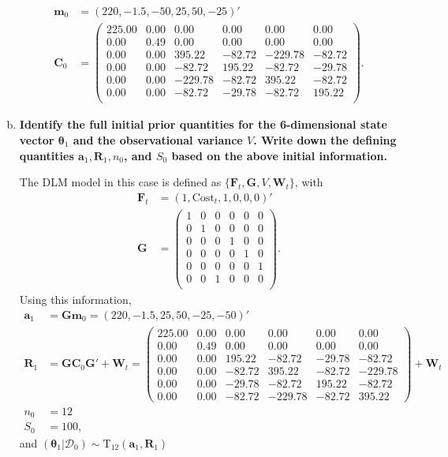 \documentclass{article}
\newcommand{\sD}{\mathcal{D}}
\newcommand{\bm}{\mathbf{m}}
\newcommand{\bC}{\mathbf{C}}
\newcommand{\btheta}{\boldsymbol{\theta}}
\newcommand{\bF}{\mathbf{F}}
\newcommand{\bG}{\mathbf{G}}
\newcommand{\bW}{\mathbf{W}}
\newcommand{\ba}{\mathbf{a}}
\newcommand{\bR}{\mathbf{R}}
\begin{document}
\begin{enumerate}[(a)]
\begin{align*}
			\bm_0 & = (220,-1.5, -50,  25,  50, -25)' \\
			\bC_0 & = \begin{pmatrix}
			225.00 & 0.00 & 0.00 & 0.00 & 0.00 & 0.00 \\ 
			0.00 & 0.49 & 0.00 & 0.00 & 0.00 & 0.00 \\ 
			0.00 & 0.00 & 395.22 & -82.72 & -229.78 & -82.72 \\ 
			0.00 & 0.00 & -82.72 & 195.22 & -82.72 & -29.78 \\ 
			0.00 & 0.00 & -229.78 & -82.72 & 395.22 & -82.72 \\ 
			0.00 & 0.00 & -82.72 & -29.78 & -82.72 & 195.22 \\ 
			\end{pmatrix}.
		\end{align*}
		
		\item \textbf{Identify the full initial prior quantities for the 6-dimensional state vector $\btheta_1$ and the observational variance $V$. Write down the defining quantities $\ba_1,\bR_1,n_0$, and $S_0$ based on the above initial information.}
		
		The DLM model in this case is defined as $\{ \bF_t, \bG,V,\bW_t \}$, with 
		\begin{align*}
			\bF_t & = (1,\text{Cost}_t,1,0,0,0)' \\
			\bG & = \begin{pmatrix}
			1 & 0 & 0 & 0 & 0 & 0 \\
			0 & 1 & 0 & 0 & 0 & 0 \\
			0 & 0 & 0 & 1 & 0 & 0 \\
			0 & 0 & 0 & 0 & 1 & 0 \\
			0 & 0 & 0 & 0 & 0 & 1 \\
			0 & 0 & 1 & 0 & 0 & 0 \\
			\end{pmatrix}.
		\end{align*}
		Using this information,
		\begin{align*}
			\ba_1 & = \bG\bm_0 = (220,  -1.5,  25,  50, -25, -50)' \\
			\bR_1 & = \bG\bC_0\bG' + \bW_t = \begin{pmatrix}
			225.00 & 0.00 & 0.00 & 0.00 & 0.00 & 0.00 \\ 
			0.00 & 0.49 & 0.00 & 0.00 & 0.00 & 0.00 \\ 
			0.00 & 0.00 & 195.22 & -82.72 & -29.78 & -82.72 \\ 
			0.00 & 0.00 & -82.72 & 395.22 & -82.72 & -229.78 \\ 
			0.00 & 0.00 & -29.78 & -82.72 & 195.22 & -82.72 \\ 
			0.00 & 0.00 & -82.72 & -229.78 & -82.72 & 395.22 
			\end{pmatrix}  + \bW_t\\
			n_0 & = 12 \\
			S_0 & = 100,
		\end{align*}
		and $(\btheta_1|\sD_0) \sim \text{T}_{12}(\ba_1,\bR_1)$
		
	\end{enumerate}
	
	
\end{document}
